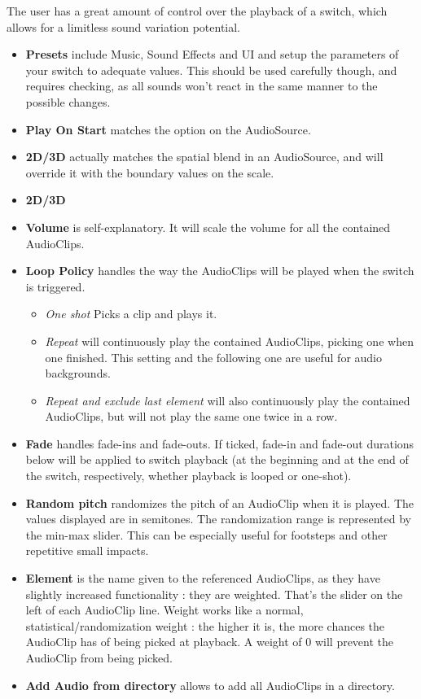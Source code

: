 \documentclass[a4paper,10pt]{article}
\begin{document}
The user has a great amount of control over the playback of a switch, which allows for a limitless sound variation potential.
	\begin{itemize}
	\item \textbf{Presets} include Music, Sound Effects and UI and setup the parameters of your switch to adequate values. This should be used carefully though, and requires checking, as all sounds won't react in the same manner to the possible changes.
	\item \textbf{Play On Start} matches the option on the AudioSource.
	\item \textbf{2D/3D} actually matches the spatial blend in an AudioSource, and will override it with the boundary values on the scale.
	\item \textbf{2D/3D}
	\item \textbf{Volume} is self-explanatory. It will scale the volume for all the contained AudioClips.
	\item \textbf{Loop Policy} handles the way the AudioClips will be played when the switch is triggered. 
		\begin{itemize}
		\item \emph{One shot} Picks a clip and plays it.
		\item \emph{Repeat} will continuously play the contained AudioClips, picking one when one finished. This setting and the following one are useful for audio backgrounds.
		\item \emph{Repeat and exclude last element} will also continuously play the contained AudioClips, but will not play the same one twice in a row.
		\end{itemize}
	\item \textbf{Fade} handles fade-ins and fade-outs. If ticked, fade-in and fade-out durations below will be applied to switch playback (at the beginning and at the end of the switch, respectively, whether playback is looped or one-shot).
	\item \textbf{Random pitch} randomizes the pitch of an AudioClip when it is played. The values displayed are in semitones. The randomization range is represented by the min-max slider. This can be especially useful for footsteps and other repetitive small impacts.
	\item \textbf{Element} is the name given to the referenced AudioClips, as they have slightly increased functionality : they are weighted. That's the slider on the left of each AudioClip line. Weight works like a normal, statistical/randomization weight : the higher it is, the more chances the AudioClip has of being picked at playback. A weight of 0 will prevent the AudioClip from being picked.
	\item \textbf{Add Audio from directory} allows to add all AudioClips in a directory.
	\end{itemize}
\end{document}
